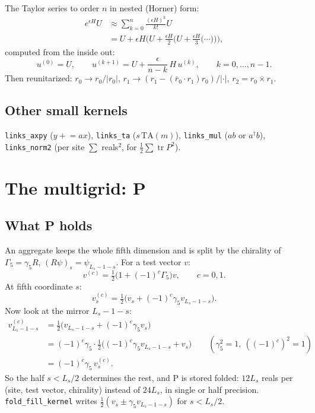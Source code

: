 \documentclass[11pt,a4paper]{article}
\numberwithin{equation}{section}
\newcommand{\code}[1]{\texttt{\small #1}}
\newcommand{\dg}{^{\dagger}}
\newcommand{\tr}{\operatorname{tr}}
\begin{document}
The Taylor series to order $n$ in nested (Horner) form:
\begin{align}
e^{\epsilon H}U &\approx \sum_{k=0}^n\frac{(\epsilon H)^k}{k!}U\\
&= U + \epsilon H\Big(U + \frac{\epsilon H}{2}\Big(U + \frac{\epsilon H}{3}\big(\cdots\big)\Big)\Big),
\end{align}
computed from the inside out:
\begin{equation}
u^{(0)} = U,\qquad u^{(k+1)} = U + \frac{\epsilon}{n-k}\,H\,u^{(k)},\qquad k=0,\dots,n-1 .
\end{equation}
Then reunitarized: $r_0\to r_0/|r_0|$, $r_1\to(r_1-(\bar r_0\cdot r_1)r_0)/|\cdot|$,
$r_2=\overline{r_0\times r_1}$.

\subsection{Other small kernels}

\code{links\_axpy} ($y\mathrel{+}=ax$), \code{links\_ta} ($s\,\mathrm{TA}(m)$), \code{links\_mul}
($ab$ or $a\dg b$), \code{links\_norm2} (per site $\sum$ reals$^2$, for $\tfrac12\sum\tr P^2$).

\section{The multigrid: P}

\subsection{What P holds}

An aggregate keeps the whole fifth dimension and is split by the chirality of
$\Gamma_5=\gamma_5R$, $(R\psi)_s=\psi_{L_s-1-s}$. For a test vector $v$:
\begin{equation}
v^{(c)} = \tfrac12\big(1+(-1)^c\Gamma_5\big)v,\qquad c=0,1 .
\end{equation}
At fifth coordinate $s$:
\begin{equation}
v^{(c)}_s = \tfrac12\big(v_s + (-1)^c\gamma_5v_{L_s-1-s}\big).
\end{equation}
Now look at the mirror $L_s-1-s$:
\begin{align}
v^{(c)}_{L_s-1-s} &= \tfrac12\big(v_{L_s-1-s} + (-1)^c\gamma_5v_s\big)\\
&= (-1)^c\gamma_5\cdot\tfrac12\big((-1)^c\gamma_5v_{L_s-1-s} + v_s\big)\qquad(\gamma_5^2=1,\ ((-1)^c)^2=1)\\
&= (-1)^c\gamma_5\,v^{(c)}_s .
\end{align}
So the half $s<L_s/2$ determines the rest, and P is stored folded: $12L_s$ reals per (site, test
vector, chirality) instead of $24L_s$, in single or half precision. \code{fold\_fill\_kernel}
writes $\tfrac12(v_s\pm\gamma_5v_{L_s-1-s})$ for $s<L_s/2$.
\end{document}
